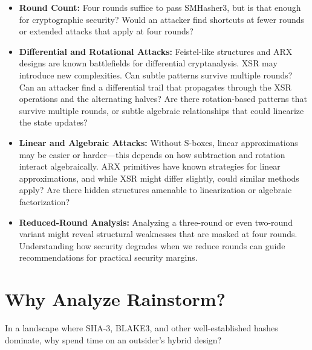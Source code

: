 \documentclass[11pt,a4paper]{article}
\begin{document}
\begin{itemize}
  \item \textbf{Round Count:} Four rounds suffice to pass SMHasher3, but is that enough for cryptographic security? Would an attacker find shortcuts at fewer rounds or extended attacks that apply at four rounds?

  \item \textbf{Differential and Rotational Attacks:} Feistel-like structures and ARX designs are known battlefields for differential cryptanalysis. XSR may introduce new complexities. Can subtle patterns survive multiple rounds? Can an attacker find a differential trail that propagates through the XSR operations and the alternating halves? Are there rotation-based patterns that survive multiple rounds, or subtle algebraic relationships that could linearize the state updates?

  \item \textbf{Linear and Algebraic Attacks:} Without S-boxes, linear approximations may be easier or harder—this depends on how subtraction and rotation interact algebraically. ARX primitives have known strategies for linear approximations, and while XSR might differ slightly, could similar methods apply? Are there hidden structures amenable to linearization or algebraic factorization?

  \item \textbf{Reduced-Round Analysis:} Analyzing a three-round or even two-round variant might reveal structural weaknesses that are masked at four rounds. Understanding how security degrades when we reduce rounds can guide recommendations for practical security margins.
\end{itemize}

\section*{Why Analyze Rainstorm?}
In a landscape where SHA-3, BLAKE3, and other well-established hashes dominate, why spend time on an outsider’s hybrid design?
\end{document}
